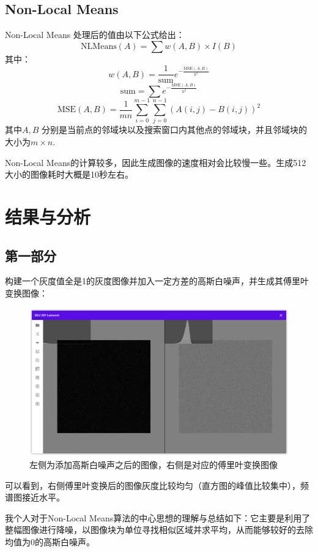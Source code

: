 \documentclass{article}
\begin{document}
\subsection{Non-Local Means}

Non-Local Means 处理后的值由以下公式给出：$$\text{NLMeans}(A)=\sum w(A, B)\times I(B)$$
其中：
$$w(A, B)=\frac{1}{\text{sum}}e^{-\frac{\text{MSE}(A, B)}{h^2}}$$
$$\text{sum}=\sum e^{-\frac{\text{MSE}(A, B)}{h^2}}$$
$$\text{MSE}(A, B)=\frac{1}{mn}\sum_{i=0}^{m-1}\sum_{j=0}^{n-1}(A(i, j)-B(i, j))^2$$
其中$A, B$ 分别是当前点的邻域块以及搜索窗口内其他点的邻域块，并且邻域块的大小为$m\times n$.

Non-Local Means的计算较多，因此生成图像的速度相对会比较慢一些。生成512大小的图像耗时大概是10秒左右。

\section{结果与分析}

\subsection{第一部分}

构建一个灰度值全是1的灰度图像并加入一定方差的高斯白噪声，并生成其傅里叶变换图像：

\begin{figure}[H]
    \includegraphics[width=\textwidth]{img/gaussian-fourier.png}
    \caption{左侧为添加高斯白噪声之后的图像，右侧是对应的傅里叶变换图像}
\end{figure}

可以看到，右侧傅里叶变换后的图像灰度比较均匀（直方图的峰值比较集中），频谱图接近水平。

我个人对于Non-Local Means算法的中心思想的理解与总结如下：它主要是利用了整幅图像进行降噪，以图像块为单位寻找相似区域并求平均，从而能够较好的去除均值为0的高斯白噪声。
\end{document}
